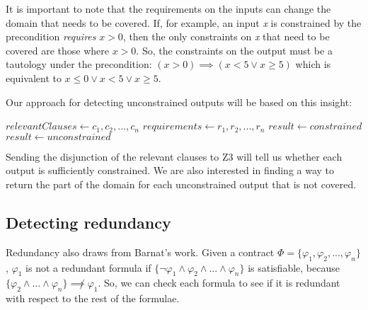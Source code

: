 \documentclass{article}
\newif\ifcomments
\newcommand{\egm}[1]{\ifcomments\textcolor{orange}{egm: #1}\fi}
\newcommand{\cass}[1]{\ifcomments\textcolor{blue}{cass: #1}\fi}
\begin{document}
It is important to note that the requirements on the inputs can change the domain that needs to be covered. If, for example, 
an input {\it x} is constrained by the precondition {\it requires} \(x > 0\), then the only constraints on {\it x} that need to 
be covered are those where \(x > 0\). So, the constraints on the output must be a tautology under the precondition: 
\((x > 0) \implies (x < 5 \lor x \geq 5)\) which is equivalent to \(x \leq 0 \lor x < 5 \lor x \geq 5\).

Our approach for detecting unconstrained outputs will be based on this insight:
\break

\begin{algorithmic}

    \State $relevantClauses \gets c_{1}, c_{2}, ..., c_{n}$ 
    \State $requirements \gets r_{1}, r_{2}, ..., r_{n}$
        \State $result \gets constrained$
    \Else
        \State $result \gets unconstrained$
    \EndIf
\EndFor

\end{algorithmic}

Sending the disjunction of the relevant clauses to Z3 will tell us whether each output is sufficiently constrained. 
We are also interested in finding a way to return the part of the domain for each unconstrained output that
is not covered. 
\egm{OK. Interesting. So if the ensures form a tautalogy then the output is constrained under every input? How do the pre-conditions factor in? It would have to be a tautology under the pre-condition constraints. Right? How is that logically stated?}
\cass{Does what I wrote make sense? Anding the preconditions on to the disjunction of relevant clauses makes it so that we are only checking the relevant domain. I added that to the pseudocode}

\subsection{Detecting redundancy}

Redundancy also draws from Barnat's work. Given a contract \(\Phi = \{\varphi_{1}, \varphi_{2}, ..., \varphi_{n}\}\),
\(\varphi_{1}\) is not a redundant formula if \(\{\neg \varphi_{1} \land \varphi_{2} \land ... \land \varphi_{n}\}\)
is satisfiable, because \(\{\varphi_{2} \land ... \land \varphi_{n}\} \not\implies \varphi_{1}\). So, we can check
each formula to see if it is redundant with respect to the rest of the formulae. 
\end{document}
